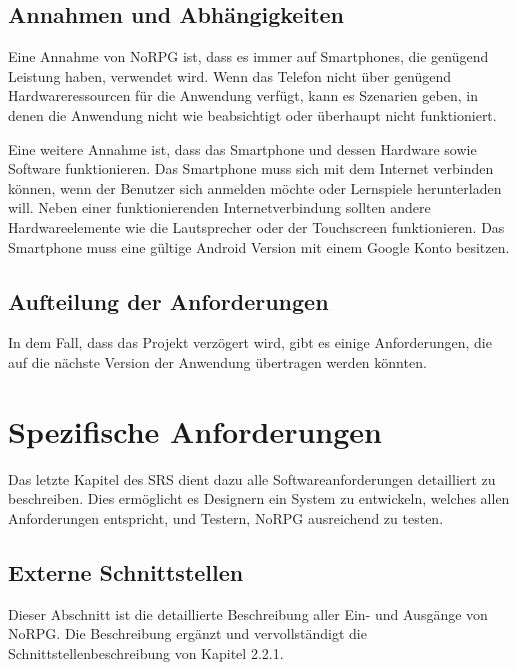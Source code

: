	\subsection{Annahmen und Abhängigkeiten}
		Eine Annahme von NoRPG ist, dass es immer auf Smartphones, die genügend Leistung haben, verwendet wird. Wenn das Telefon nicht über genügend Hardwareressourcen für die Anwendung verfügt, kann es Szenarien geben, in denen die Anwendung nicht wie beabsichtigt oder überhaupt nicht funktioniert.
		
		Eine weitere Annahme ist, dass das Smartphone und dessen Hardware sowie Software funktionieren. Das Smartphone muss sich mit dem Internet verbinden können, wenn der Benutzer sich anmelden möchte oder Lernspiele herunterladen will. Neben einer funktionierenden Internetverbindung sollten andere Hardwareelemente wie die Lautsprecher oder der Touchscreen funktionieren. Das Smartphone muss eine gültige Android Version mit einem Google Konto besitzen.
		
	\subsection{Aufteilung der Anforderungen}
		In dem Fall, dass das Projekt verzögert wird, gibt es einige Anforderungen, die auf die nächste Version der Anwendung übertragen werden könnten.

\section{Spezifische Anforderungen}
	Das letzte Kapitel des SRS dient dazu alle Softwareanforderungen detailliert zu beschreiben. Dies ermöglicht es Designern ein System zu entwickeln, welches allen Anforderungen entspricht, und Testern, NoRPG ausreichend zu testen.
	
	\subsection{Externe Schnittstellen}
		Dieser Abschnitt ist die detaillierte Beschreibung aller Ein- und Ausgänge von NoRPG. Die Beschreibung ergänzt und vervollständigt die Schnittstellenbeschreibung von Kapitel 2.2.1. 
	
	
